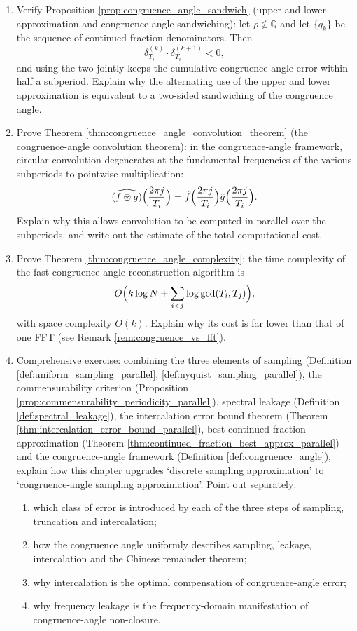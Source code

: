 \begin{enumerate}[leftmargin=3em, label=\textbf{Exercise \arabic*}]
    \item Verify Proposition \ref{prop:congruence_angle_sandwich} (upper and lower approximation and congruence-angle sandwiching):
    let $\rho\notin\mathbb{Q}$ and let $\{q_k\}$ be the sequence of continued-fraction denominators. Then
    \[
    \delta_{T_i}^{(k)}\cdot\delta_{T_i}^{(k+1)}<0,
    \]
    and using the two jointly keeps the cumulative congruence-angle error within half a subperiod.
    Explain why the alternating use of the upper and lower approximation is equivalent to a two-sided sandwiching of the congruence angle.

    \item Prove Theorem \ref{thm:congruence_angle_convolution_theorem} (the congruence-angle convolution theorem):
    in the congruence-angle framework, circular convolution degenerates at the fundamental frequencies of the various subperiods to pointwise multiplication:
    \[
    \widehat{(f\circledast g)}\Bigl(\frac{2\pi j}{T_i}\Bigr)
    =\hat{f}\Bigl(\frac{2\pi j}{T_i}\Bigr)\hat{g}\Bigl(\frac{2\pi j}{T_i}\Bigr).
    \]
    Explain why this allows convolution to be computed in parallel over the subperiods,
    and write out the estimate of the total computational cost.

    \item Prove Theorem \ref{thm:congruence_angle_complexity}:
    the time complexity of the fast congruence-angle reconstruction algorithm is
    \[
    O\Bigl(k\log N+\sum_{i<j}\log\gcd(T_i,T_j)\Bigr),
    \]
    with space complexity $O(k)$. Explain why its cost is far lower than that of one FFT
    (see Remark \ref{rem:congruence_vs_fft}).

    \item Comprehensive exercise: combining the three elements of sampling (Definition \ref{def:uniform_sampling_parallel},
    \ref{def:nyquist_sampling_parallel}),
    the commensurability criterion (Proposition \ref{prop:commensurability_periodicity_parallel}),
    spectral leakage (Definition \ref{def:spectral_leakage}),
    the intercalation error bound theorem (Theorem \ref{thm:intercalation_error_bound_parallel}),
    best continued-fraction approximation (Theorem \ref{thm:continued_fraction_best_approx_parallel})
    and the congruence-angle framework (Definition \ref{def:congruence_angle}),
    explain how this chapter upgrades `discrete sampling approximation' to `congruence-angle sampling approximation'.
    Point out separately:
    \begin{enumerate}[label=(\roman*)]
        \item which class of error is introduced by each of the three steps of sampling, truncation and intercalation;
        \item how the congruence angle uniformly describes sampling, leakage, intercalation and the Chinese remainder theorem;
        \item why intercalation is the optimal compensation of congruence-angle error;
        \item why frequency leakage is the frequency-domain manifestation of congruence-angle non-closure.
    \end{enumerate}
\end{enumerate}
